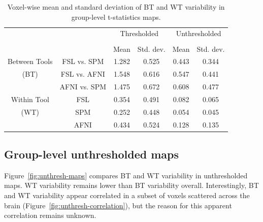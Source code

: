 \documentclass[conference]{IEEEtran}
\begin{document}
\setlength{\tabcolsep}{5pt}
\begin{table}[h]
    \centering
    \begin{tabular}{cccc|cc}
        \toprule
        \multirow{2}{*}{}& {} & \multicolumn{2}{c}{Thresholded} & \multicolumn{2}{c}{Unthresholded} \\
        \cmidrule{3-4} \cmidrule{5-6} \\
        {} & {} & Mean & Std. dev. & Mean & Std. dev. \\
        \midrule
        \rowcolor{lightgray}
        {Between Tools} & FSL vs. SPM        &  1.282       & 0.525      & 0.443     & 0.344  \\
        \rowcolor{lightgray}
        {(BT)} & FSL vs. AFNI                &  1.548       & 0.616      & 0.547     & 0.441  \\
        \rowcolor{lightgray}
        {} & AFNI vs. SPM                    &  1.475       & 0.672      & 0.608     & 0.477  \\
        {Within Tool} & FSL                  &  0.354       & 0.491      & 0.082     & 0.065  \\
        {(WT)}   & SPM                       &  0.252       & 0.448      & 0.054     & 0.045  \\
        {}   & AFNI                          &  0.434       & 0.524      & 0.128     & 0.135  \\
        \bottomrule
    \end{tabular}
    \caption{Voxel-wise mean and standard deviation of BT and WT variability
    in group-level t-statistics maps.}
    \label{table:pipeline-stats}
\end{table}


\subsection{Group-level unthresholded maps}

Figure~\ref{fig:unthresh-maps} compares BT and WT variability in
unthresholded maps. WT variability remains lower than BT variability
overall. Interestingly, BT and WT variability appear correlated in a subset
of voxels scattered across the brain
(Figure~\ref{fig:unthresh-correlation}), but the reason for this apparent
correlation remains unknown.
\end{document}
